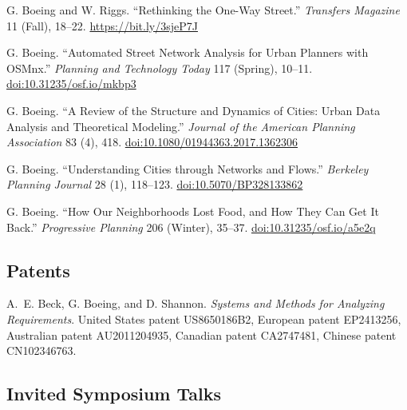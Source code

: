     \begin{tablist}

        \item[2023] \tab{}G. Boeing and W. Riggs. \enquote{Rethinking the One-Way Street.} \textit{Transfers Magazine} 11 (Fall), 18--22. \href{https://bit.ly/3sjeP7J}{https://bit.ly/3sjeP7J}

        \item[2018] \tab{}G. Boeing. \enquote{Automated Street Network Analysis for Urban Planners with OSMnx.} \textit{Planning and Technology Today} 117 (Spring), 10--11. \href{https://doi.org/10.31235/osf.io/mkbp3}{doi:10.31235/osf.io/mkbp3}

        \item[2017] \tab{}G. Boeing. \enquote{A Review of the Structure and Dynamics of Cities: Urban Data Analysis and Theoretical Modeling.} \textit{Journal of the American Planning Association} 83 (4), 418. \href{https://doi.org/10.1080/01944363.2017.1362306}{doi:10.1080/01944363.2017.1362306}

        \item[2017] \tab{}G. Boeing. \enquote{Understanding Cities through Networks and Flows.} \textit{Berkeley Planning Journal} 28 (1), 118--123. \href{https://doi.org/10.5070/BP328133862}{doi:10.5070/BP328133862}

        \item[2016] \tab{}G. Boeing. \enquote{How Our Neighborhoods Lost Food, and How They Can Get It Back.} \textit{Progressive Planning} 206 (Winter), 35--37. \href{https://doi.org/10.31235/osf.io/a5e2q}{doi:10.31235/osf.io/a5e2q}

    \end{tablist}


    \subsection*{Patents}

    \begin{tablist}

        \item[2014] \tab{}A.~E. Beck, G. Boeing, and D. Shannon. \textit{Systems and Methods for Analyzing Requirements}. United States patent US8650186B2, European patent EP2413256, Australian patent AU2011204935, Canadian patent CA2747481, Chinese patent CN102346763.


    \end{tablist}

    \subsection*{Invited Symposium Talks}

